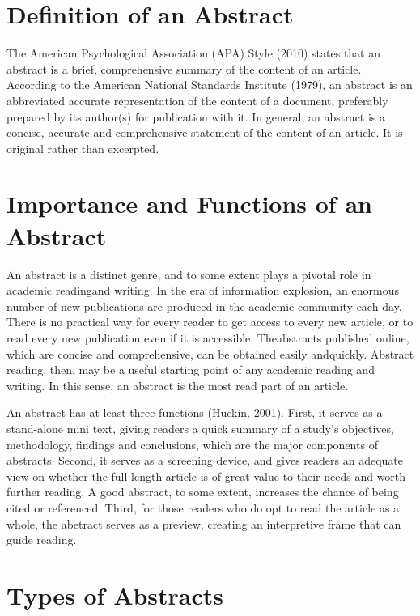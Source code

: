 \documentclass[a4paper]{ctexbook}
\begin{document}
\section{Definition of an Abstract}

The American Psychological Association (APA) Style (2010) states that an abstract is a brief, comprehensive summary of the content of an article. According to the American National Standards Institute (1979), an abstract is an abbreviated accurate representation of the content of a document, preferably prepared by its author(s) for publication with it. In general, an abstract is a concise, accurate and comprehensive statement of the content of an article. It is original rather than excerpted.

\section{Importance and Functions of an Abstract}

An abstract is a distinct genre, and to some extent plays a pivotal role in academic readingand writing. In the era of information explosion, an enormous number of new publications are produced in the academic community each day. There is no practical way for every reader to get access to every new article, or to read every new publication even if it is accessible. Theabstracts published online, which are concise and comprehensive, can be obtained easily andquickly. Abstract reading, then, may be a useful starting point of any academic reading and writing. In this sense, an abstract is the most read part of an article.

An abstract has at least three functions (Huckin, 2001). First, it serves as a stand-alone mini text, giving readers a quick summary of a study's objectives, methodology, findings and conclusions, which are the major components of abstracts. Second, it serves as a screening device, and gives readers an adequate view on whether the full-length article is of great value to their needs and worth further reading. A good abstract, to some extent, increases the chance of being cited or referenced. Third, for those readers who do opt to read the article as a whole, the abetract serves as a preview, creating an interpretive frame that can guide reading.

\section{Types of Abstracts}
\end{document}
